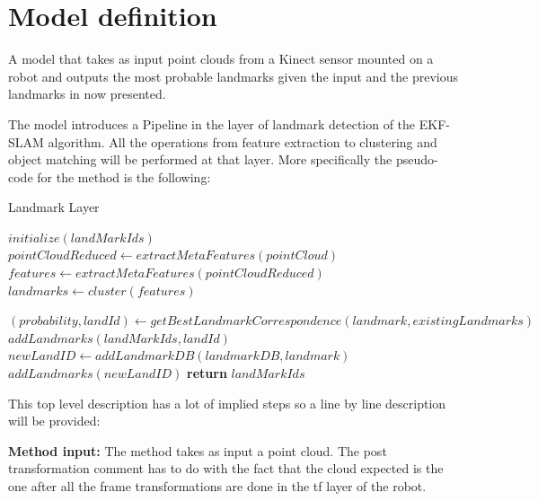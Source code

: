 \documentclass[twoside,hidelinks]{article}
\begin{document}
\section{Model definition}
\label{sec:model}

A model that takes as input point clouds from a Kinect sensor mounted on a robot and outputs the most probable landmarks given the input and the previous landmarks in now presented.

The model introduces a Pipeline in the layer of landmark detection of the EKF-SLAM algorithm. All the operations from feature extraction to clustering and object matching will be performed at that layer. More specifically the pseudo-code for the method is the following:

\begin{algorithm}
  \caption{Landmark Layer}\label{euclid}
  \begin{algorithmic}[1]
      \State $initialize(landMarkIds)$ 
      \State $pointCloudReduced \gets extractMetaFeatures(pointCloud)$ 
      \State $features \gets extractMetaFeatures(pointCloudReduced)$
      \State $landmarks \gets cluster(features)$  

	      \State $ (probability, landId) \gets getBestLandmarkCorrespondence(landmark, existingLandmarks) $
			   \State $ addLandmarks(landMarkIds, landId)$
			\Else 
			   \State $ newLandID \gets addLandmarkDB(landmarkDB, landmark)$ 
			   \State $addLandmarks(newLandID)$ 	   
			\EndIf
      \EndFor
      \State \textbf{return} $ landMarkIds$
    \EndProcedure
  \end{algorithmic}
\end{algorithm}


This top level description has a lot of implied steps so a line by line description will be provided:

\textbf{Method input:} The method takes as input a point cloud. The post transformation comment has to do with the fact that the 
cloud expected is the one after all the frame transformations are done in the tf layer of the robot.
\end{document}
